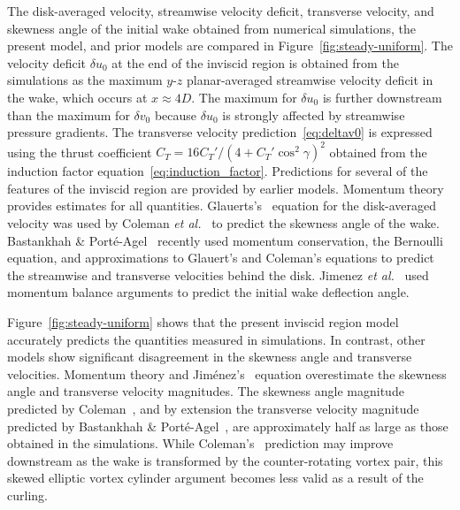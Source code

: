 The disk-averaged velocity, streamwise velocity deficit, transverse velocity, and skewness angle of the initial wake obtained from numerical simulations, the present model, and prior models are compared in Figure~\ref{fig:steady-uniform}. The velocity deficit $\delta u_0$ at the end of the inviscid region is obtained from the simulations as the maximum $y$-$z$ planar-averaged streamwise velocity deficit in the wake, which occurs at $x \approx 4D$. The maximum for $\delta u_0$ is further downstream than the maximum for $\delta v_0$ because $\delta u_0$ is strongly affected by streamwise pressure gradients. The transverse velocity prediction~\eqref{eq:deltav0} is expressed using the thrust coefficient $C_T = 16 C_T'/(4 + C_T'\cos^2\gamma)^2$ obtained from the induction factor equation~\eqref{eq:induction_factor}. Predictions for several of the features of the inviscid region are provided by earlier models. Momentum theory~\cite{Burton2011a} provides estimates for all quantities. Glauerts's~\cite{Glauert1926a} equation for the disk-averaged velocity was used by Coleman \textit{et al.}~\cite{Coleman1945a, Burton2011a} to predict the skewness angle of the wake. Bastankhah \& Port\'{e}-Agel~\cite{Bastankhah2016a} recently used momentum conservation, the Bernoulli equation, and approximations to Glauert's and Coleman's equations to predict the streamwise and transverse velocities behind the disk. Jimenez \textit{et al.}~\cite{Jimenez2010a} used momentum balance arguments to predict the initial wake deflection angle. 

Figure~\ref{fig:steady-uniform} shows that the present inviscid region model accurately predicts the quantities measured in simulations. In contrast, other models show significant disagreement in the skewness angle and transverse velocities. Momentum theory and Jim\'{e}nez's~\cite{Jimenez2010a} equation overestimate the skewness angle and transverse velocity magnitudes. The skewness angle magnitude predicted by Coleman~\cite{Coleman1945a}, and by extension the transverse velocity magnitude predicted by Bastankhah \& Port\'{e}-Agel~\cite{Bastankhah2016a}, are approximately half as large as those obtained in the simulations. While Coleman's~\cite{Coleman1945a} prediction may improve downstream as the wake is transformed by the counter-rotating vortex pair, this skewed elliptic vortex cylinder argument becomes less valid as a result of the curling. 

